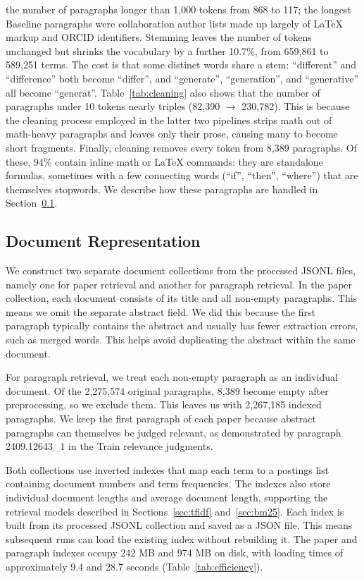 \documentclass[sigconf,nonacm]{acmart}
\begin{document}
the number of paragraphs longer than 1,000 tokens from 868 to 117; the
longest Baseline paragraphs were collaboration author lists made up
largely of \LaTeX{} markup and ORCID identifiers. Stemming leaves the
number of tokens unchanged but shrinks the vocabulary by a further
10.7\%, from 659,861 to 589,251 terms. The cost is that some distinct
words share a stem: ``different'' and ``difference'' both become
``differ'', and ``generate'', ``generation'', and ``generative'' all
become ``generat''. Table~\ref{tab:cleaning} also shows that the number
of paragraphs under 10 tokens nearly triples (82,390 $\rightarrow$ 230,782). 
This is because the cleaning process employed in the latter two pipelines
strips math out of math-heavy paragraphs and leaves only their prose, causing
many to become short fragments. Finally, cleaning removes every token from 8,389 
paragraphs. Of these, 94\% contain inline math or \LaTeX{} commands: 
they are standalone formulas, sometimes with a few connecting words 
(``if'', ``then'', ``where'') that are themselves stopwords. We describe 
how these paragraphs are handled in Section~\ref{sec:docrep}.

\subsection{Document Representation}
\label{sec:docrep}
We construct two separate document collections from the processed JSONL files, namely one for paper retrieval and another for paragraph retrieval. In the paper collection, each document consists of its title and all non-empty paragraphs. This means we omit the separate abstract field. We did this because the first paragraph typically contains the abstract and usually has fewer extraction errors, such as merged words. This helps avoid duplicating the abstract within the same document. 

For paragraph retrieval, we treat each non-empty paragraph as an individual document. Of the 2,275,574 original paragraphs, 8,389 become empty after preprocessing, so we exclude them. This leaves us with 2,267,185 indexed paragraphs. We keep the first paragraph of each paper because abstract paragraphs can themselves be judged relevant, as demonstrated by paragraph 2409.12643\_1 in the Train relevance judgments. 

Both collections use inverted indexes that map each term to a postings list containing document numbers and term frequencies. The indexes also store individual document lengths and average document length, supporting the retrieval models described in Sections~\ref{sec:tfidf} and~\ref{sec:bm25}. Each index is built from its processed JSONL collection and saved as a JSON file. This means subsequent runs can load the existing index without rebuilding it. The paper and paragraph indexes occupy 242 MB and 974 MB on disk, with loading times of approximately 9.4 and 28.7 seconds (Table~\ref{tab:efficiency}).
\end{document}
